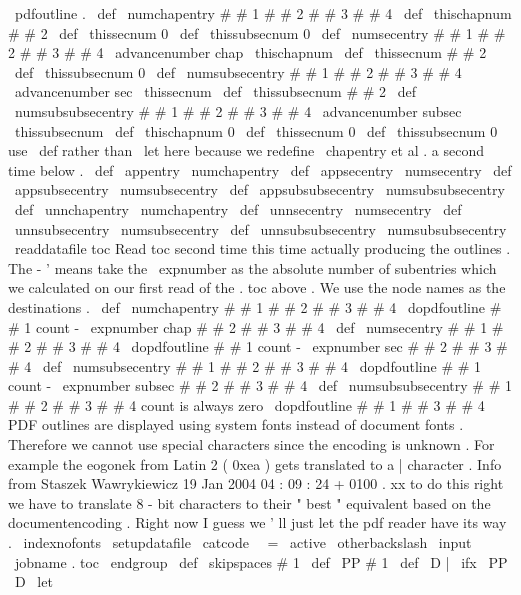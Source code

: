{{\
pdfoutline
.
\
def
\
numchapentry
#
#
1
#
#
2
#
#
3
#
#
4
{
%
\
def
\
thischapnum
{
#
#
2
}
%
\
def
\
thissecnum
{
0
}
%
\
def
\
thissubsecnum
{
0
}
%
}
%
\
def
\
numsecentry
#
#
1
#
#
2
#
#
3
#
#
4
{
%
\
advancenumber
{
chap
\
thischapnum
}
%
\
def
\
thissecnum
{
#
#
2
}
%
\
def
\
thissubsecnum
{
0
}
%
}
%
\
def
\
numsubsecentry
#
#
1
#
#
2
#
#
3
#
#
4
{
%
\
advancenumber
{
sec
\
thissecnum
}
%
\
def
\
thissubsecnum
{
#
#
2
}
%
}
%
\
def
\
numsubsubsecentry
#
#
1
#
#
2
#
#
3
#
#
4
{
%
\
advancenumber
{
subsec
\
thissubsecnum
}
%
}
%
\
def
\
thischapnum
{
0
}
%
\
def
\
thissecnum
{
0
}
%
\
def
\
thissubsecnum
{
0
}
%
%
%
use
\
def
rather
than
\
let
here
because
we
redefine
\
chapentry
et
%
al
.
a
second
time
below
.
\
def
\
appentry
{
\
numchapentry
}
%
\
def
\
appsecentry
{
\
numsecentry
}
%
\
def
\
appsubsecentry
{
\
numsubsecentry
}
%
\
def
\
appsubsubsecentry
{
\
numsubsubsecentry
}
%
\
def
\
unnchapentry
{
\
numchapentry
}
%
\
def
\
unnsecentry
{
\
numsecentry
}
%
\
def
\
unnsubsecentry
{
\
numsubsecentry
}
%
\
def
\
unnsubsubsecentry
{
\
numsubsubsecentry
}
%
\
readdatafile
{
toc
}
%
%
%
Read
toc
second
time
this
time
actually
producing
the
outlines
.
%
The
-
'
means
take
the
\
expnumber
as
the
absolute
number
of
%
subentries
which
we
calculated
on
our
first
read
of
the
.
toc
above
.
%
%
We
use
the
node
names
as
the
destinations
.
\
def
\
numchapentry
#
#
1
#
#
2
#
#
3
#
#
4
{
%
\
dopdfoutline
{
#
#
1
}
{
count
-
\
expnumber
{
chap
#
#
2
}
}
{
#
#
3
}
{
#
#
4
}
}
%
\
def
\
numsecentry
#
#
1
#
#
2
#
#
3
#
#
4
{
%
\
dopdfoutline
{
#
#
1
}
{
count
-
\
expnumber
{
sec
#
#
2
}
}
{
#
#
3
}
{
#
#
4
}
}
%
\
def
\
numsubsecentry
#
#
1
#
#
2
#
#
3
#
#
4
{
%
\
dopdfoutline
{
#
#
1
}
{
count
-
\
expnumber
{
subsec
#
#
2
}
}
{
#
#
3
}
{
#
#
4
}
}
%
\
def
\
numsubsubsecentry
#
#
1
#
#
2
#
#
3
#
#
4
{
%
count
is
always
zero
\
dopdfoutline
{
#
#
1
}
{
}
{
#
#
3
}
{
#
#
4
}
}
%
%
%
PDF
outlines
are
displayed
using
system
fonts
instead
of
%
document
fonts
.
Therefore
we
cannot
use
special
characters
%
since
the
encoding
is
unknown
.
For
example
the
eogonek
from
%
Latin
2
(
0xea
)
gets
translated
to
a
|
character
.
Info
from
%
Staszek
Wawrykiewicz
19
Jan
2004
04
:
09
:
24
+
0100
.
%
%
xx
to
do
this
right
we
have
to
translate
8
-
bit
characters
to
%
their
"
best
"
equivalent
based
on
the
documentencoding
.
Right
%
now
I
guess
we
'
ll
just
let
the
pdf
reader
have
its
way
.
\
indexnofonts
\
setupdatafile
\
catcode
\
\
=
\
active
\
otherbackslash
\
input
\
jobname
.
toc
\
endgroup
}
%
\
def
\
skipspaces
#
1
{
\
def
\
PP
{
#
1
}
\
def
\
D
{
|
}
%
\
ifx
\
PP
\
D
\
let
\
}}

